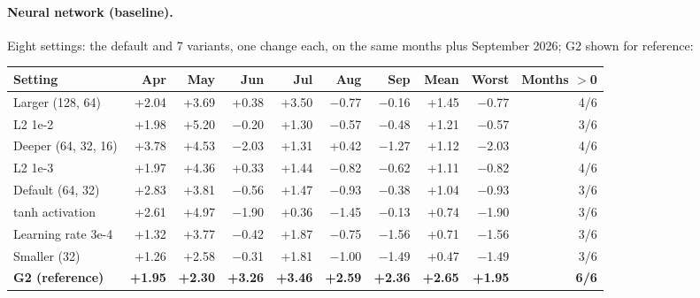\documentclass[11pt,a4paper]{article}
\begin{document}
\paragraph{Neural network (baseline).} Eight settings: the default and 7 variants, one change each, on the same
months plus September 2026; G2 shown for reference:
\begin{center}
\small\setlength{\tabcolsep}{4.5pt}
\begin{tabular}{@{}lrrrrrrrrr@{}}
\toprule
Setting & Apr & May & Jun & Jul & Aug & Sep & Mean & Worst & Months $>$0 \\
\midrule
Larger (128, 64) & +2.04 & +3.69 & +0.38 & +3.50 & $-$0.77 & $-$0.16 & +1.45 & $-$0.77 & 4/6 \\
L2 1e-2 & +1.98 & +5.20 & $-$0.20 & +1.30 & $-$0.57 & $-$0.48 & +1.21 & $-$0.57 & 3/6 \\
Deeper (64, 32, 16) & +3.78 & +4.53 & $-$2.03 & +1.31 & +0.42 & $-$1.27 & +1.12 & $-$2.03 & 4/6 \\
L2 1e-3 & +1.97 & +4.36 & +0.33 & +1.44 & $-$0.82 & $-$0.62 & +1.11 & $-$0.82 & 4/6 \\
Default (64, 32) & +2.83 & +3.81 & $-$0.56 & +1.47 & $-$0.93 & $-$0.38 & +1.04 & $-$0.93 & 3/6 \\
tanh activation & +2.61 & +4.97 & $-$1.90 & +0.36 & $-$1.45 & $-$0.13 & +0.74 & $-$1.90 & 3/6 \\
Learning rate 3e-4 & +1.32 & +3.77 & $-$0.42 & +1.87 & $-$0.75 & $-$1.56 & +0.71 & $-$1.56 & 3/6 \\
Smaller (32) & +1.26 & +2.58 & $-$0.31 & +1.81 & $-$1.00 & $-$1.49 & +0.47 & $-$1.49 & 3/6 \\
\midrule
\textbf{G2 (reference)} & \textbf{+1.95} & \textbf{+2.30} & \textbf{+3.26} & \textbf{+3.46} & \textbf{+2.59} & \textbf{+2.36} & \textbf{+2.65} & \textbf{+1.95} & \textbf{6/6} \\
\bottomrule
\end{tabular}
\end{center}
\end{document}
